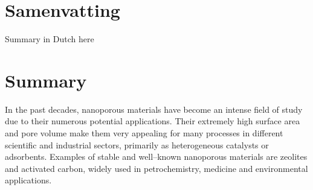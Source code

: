 \chapter{Samenvatting}
Summary in Dutch here

\chapter{Summary}
 In the past decades, nanoporous materials have become an intense field of study due to their numerous potential applications. Their extremely high surface area and pore volume make them very appealing for many processes in different scientific and industrial sectors, primarily as heterogeneous catalysts or adsorbents. Examples of stable and well--known nanoporous materials are zeolites and activated carbon, widely used in petrochemistry, medicine and environmental applications. 
\npar
